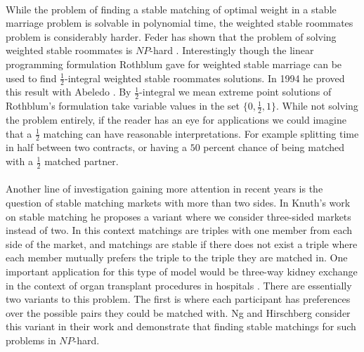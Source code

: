 \paragraph{}
While the problem of finding a stable matching of optimal weight in a stable marriage problem is solvable in polynomial time, the weighted stable roommates problem is considerably harder. Feder has shown that the problem of solving weighted stable roommates is $NP$-hard \cite{feder1992new}. Interestingly though the linear programming formulation Rothblum gave for weighted stable marriage can be used to find $\frac{1}{2}$-integral weighted stable roommates solutions. In 1994 he proved this result with Abeledo \cite{abeledo1994stable}. By $\frac{1}{2}$-integral we mean extreme point solutions of Rothblum's formulation take variable values in the set $\{0,\frac{1}{2},1\}$. While not solving the problem entirely, if the reader has an eye for applications we could imagine that a $\frac{1}{2}$ matching can have reasonable interpretations. For example splitting time in half between two contracts, or having a $50$ percent chance of being matched with a $\frac{1}{2}$ matched partner.
\paragraph{}
Another line of investigation gaining more attention in recent years is the question of stable matching markets with more than two sides. In Knuth's work on stable matching he proposes a variant where we consider three-sided markets instead of two. In this context matchings are triples with one member from each side of the market, and matchings are stable if there does not exist a triple where each member mutually prefers the triple to the triple they are matched in. One important application for this type of model would be three-way kidney exchange in the context of organ transplant procedures in hospitals \cite{saidman2006increasing}. There are essentially two variants to this problem. The first is where each participant has preferences over the possible pairs they could be matched with.  Ng and Hirschberg \cite{ng1991three} consider this variant in their work and demonstrate that finding stable matchings for such problems in $NP$-hard.
